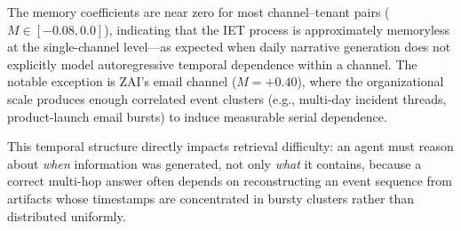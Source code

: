 The memory coefficients are near zero for most channel--tenant pairs ($M \in [-0.08, 0.0]$), indicating that the IET process is approximately memoryless at the single-channel level---as expected when daily narrative generation does not explicitly model autoregressive temporal dependence within a channel. The notable exception is ZAI's email channel ($M = +0.40$), where the organizational scale produces enough correlated event clusters (e.g., multi-day incident threads, product-launch email bursts) to induce measurable serial dependence.

This temporal structure directly impacts retrieval difficulty: an agent must reason about \emph{when} information was generated, not only \emph{what} it contains, because a correct multi-hop answer often depends on reconstructing an event sequence from artifacts whose timestamps are concentrated in bursty clusters rather than distributed uniformly.
